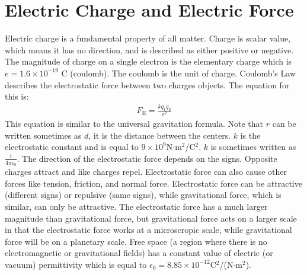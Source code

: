 \documentclass[../em.tex]{subfiles}
\begin{document}
\section{Electric Charge and Electric Force}
Electric charge is a fundamental property of all matter.
\smallbreak
Charge is scalar value, which means it has no direction, and is described as either positive or negative.
\smallbreak
The magnitude of charge on a single electron is the elementary charge which is $e = 1.6\times 10^{-19}$ C (coulomb). The coulomb is the unit of charge.
\smallbreak
Coulomb's Law describes the electrostatic force between two charges objects. The equation for this is:
\begin{align*}
    F_\text{E}=\frac{kq_1q_2}{r^2}
\end{align*}
This equation is similar to the universal gravitation formula. Note that $r$ can be written sometimes as $d$, it is the distance between the centers. $k$ is the electrostatic constant and is equal to $9\times10^9$N$\cdot $m$^2$/C$^2$. $k$ is sometimes written as $\frac{1}{4\pi\epsilon_0}$.
\smallbreak
The direction of the electrostatic force depends on the signs. Opposite charges attract and like charges repel. Electrostatic force can also cause other forces like tension, friction, and normal force.
\smallbreak
Electrostatic force can be attractive (different signs) or repulsive (same signs), while gravitational force, which is similar, can only be attractive. 
\smallbreak
The electrostatic force has a much larger magnitude than gravitational force, but gravitational force acts on a larger scale in that the electrostatic force works at a microscropic scale, while gravitational force will be on a planetary scale.
\smallbreak
Free space (a region where there is no electromagnetic or gravitational fields) has a constant value of electric (or vacuum) permittivity which is equal to $\epsilon_0 = 8.85\times10^{-12}$C$^2$/(N$\cdot$m$^2$).
\end{document}
